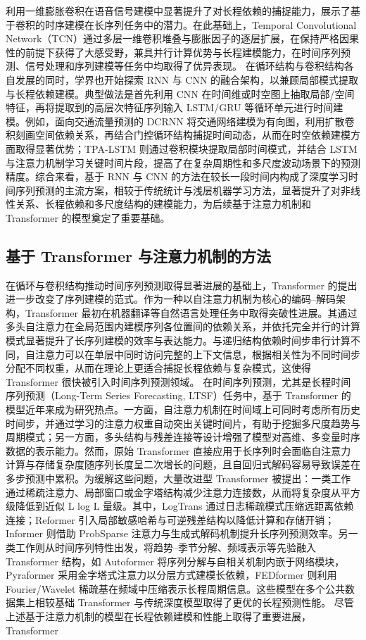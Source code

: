 利用一维膨胀卷积在语音信号建模中显著提升了对长程依赖的捕捉能力，展示了基于卷积的时序建模在长序列任务中的潜力\cite{oord2016wavenet}。在此基础上，Temporal Convolutional Network（TCN）通过多层一维卷积堆叠与膨胀因子的逐层扩展，在保持严格因果性的前提下获得了大感受野，兼具并行计算优势与长程建模能力，在时间序列预测、信号处理和序列建模等任务中均取得了优异表现\cite{bai2018empirical}。 在循环结构与卷积结构各自发展的同时，学界也开始探索 RNN 与 CNN 的融合架构，以兼顾局部模式提取与长程依赖建模。典型做法是首先利用 CNN 在时间维或时空图上抽取局部/空间特征，再将提取到的高层次特征序列输入 LSTM/GRU 等循环单元进行时间建模。例如，面向交通流量预测的 DCRNN 将交通网络建模为有向图，利用扩散卷积刻画空间依赖关系，再结合门控循环结构捕捉时间动态，从而在时空依赖建模方面取得显著优势；TPA-LSTM 则通过卷积模块提取局部时间模式，并结合 LSTM 与注意力机制学习关键时间片段，提高了在复杂周期性和多尺度波动场景下的预测精度\cite{li2018diffusion,shih2019temporal}。综合来看，基于 RNN 与 CNN 的方法在较长一段时间内构成了深度学习时间序列预测的主流方案，相较于传统统计与浅层机器学习方法，显著提升了对非线性关系、长程依赖和多尺度结构的建模能力，为后续基于注意力机制和 Transformer 的模型奠定了重要基础。 \subsection{基于 Transformer 与注意力机制的方法} 在循环与卷积结构推动时间序列预测取得显著进展的基础上，Transformer 的提出进一步改变了序列建模的范式。作为一种以自注意力机制为核心的编码--解码架构，Transformer 最初在机器翻译等自然语言处理任务中取得突破性进展。其通过多头自注意力在全局范围内建模序列各位置间的依赖关系，并依托完全并行的计算模式显著提升了长序列建模的效率与表达能力。与递归结构依赖时间步串行计算不同，自注意力可以在单层中同时访问完整的上下文信息，根据相关性为不同时间步分配不同权重，从而在理论上更适合捕捉长程依赖与复杂模式，这使得 Transformer 很快被引入时间序列预测领域\cite{chen2025transformercn}。 在时间序列预测，尤其是长程时间序列预测（Long-Term Series Forecasting, LTSF）任务中，基于 Transformer 的模型近年来成为研究热点。一方面，自注意力机制在时间域上可同时考虑所有历史时间步，并通过学习的注意力权重自动突出关键时间片，有助于挖掘多尺度趋势与周期模式；另一方面，多头结构与残差连接等设计增强了模型对高维、多变量时序数据的表示能力。然而，原始 Transformer 直接应用于长序列时会面临自注意力计算与存储复杂度随序列长度呈二次增长的问题，且自回归式解码容易导致误差在多步预测中累积。为缓解这些问题，大量改进型 Transformer 被提出：一类工作通过稀疏注意力、局部窗口或金字塔结构减少注意力连接数，从而将复杂度从平方级降低到近似 L log L 量级。其中，LogTrans 通过日志稀疏模式压缩远距离依赖连接\cite{li2019enhancing}；Reformer 引入局部敏感哈希与可逆残差结构以降低计算和存储开销\cite{kitaev2020reformer}；Informer 则借助 ProbSparse 注意力与生成式解码机制提升长序列预测效率。另一类工作则从时间序列特性出发，将趋势--季节分解、频域表示等先验融入 Transformer 结构，如 Autoformer 将序列分解与自相关机制内嵌于网络模块，Pyraformer 采用金字塔式注意力以分层方式建模长依赖\cite{liu2022pyraformer}，FEDformer 则利用 Fourier/Wavelet 稀疏基在频域中压缩表示长程周期信息。这些模型在多个公共数据集上相较基础 Transformer 与传统深度模型取得了更优的长程预测性能。 尽管上述基于注意力机制的模型在长程依赖建模和性能上取得了重要进展，Transformer 